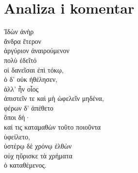 \section*{Analiza i komentar}


{\large
\begin{greek}
\noindent Ἰδὼν ἀνὴρ \\
ἄνδρα ἕτερον \\
\tabto{2em} ἀργύριον ἀναιρούμενον \\
πολὺ ἐδεῖτό \\
\tabto{2em} οἱ δανεῖσαι ἐπὶ τόκῳ, \\
ὁ δ' οὐκ ἠθέλησεν, \\
ἀλλ' ἦν οἷος \\
\tabto{2em} ἀπιστεῖν τε καὶ μὴ ὠφελεῖν μηδένα, \\
φέρων δ' ἀπέθετο \\
\tabto{2em} ὅποι δή· \\
καί τις καταμαθὼν τοῦτο ποιοῦντα \\
ὑφείλετο, \\
ὑστέρῳ δὲ χρόνῳ ἐλθὼν \\
οὐχ ηὕρισκε τὰ χρήματα \\
ὁ καταθέμενος.\\

\end{greek}
}

